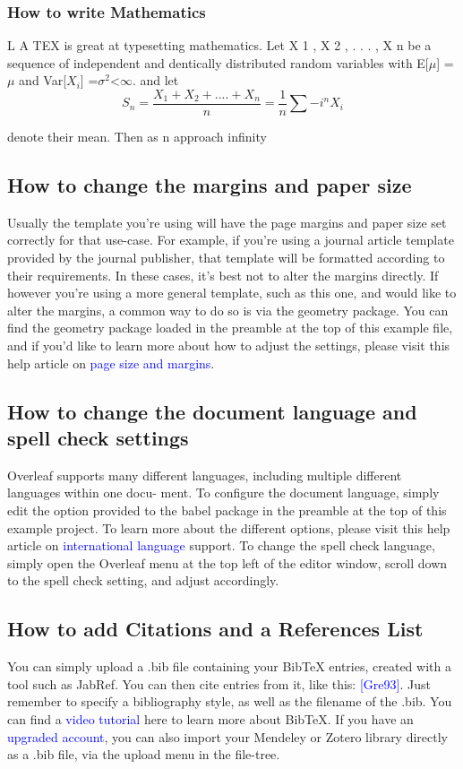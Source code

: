 \documentclass{article} %
\begin{document}
\begin{table}[h]
\subsubsection{How to write Mathematics}
	L A TEX is great at typesetting mathematics. Let X 1 , X 2 , . . . , X n be a sequence of independent and dentically distributed random variables with E[$\mu$] =$\mu$ and Var[$X_i$]
=$\sigma^2$\textless$\infty$. and let \[S_n=\frac{X_1+ X_2+....+X_n}{n}=\frac{1}{n}\sum-{i}^{n} X_i\]

denote their mean. Then as n approach infinity
\subsection{How to change the margins and paper size}
	Usually the template you’re using will have the page margins and paper size set correctly for that
	use-case. For example, if you’re using a journal article template provided by the journal publisher,
	that template will be formatted according to their requirements. In these cases, it’s best not to alter
	the margins directly.
	If however you’re using a more general template, such as this one, and would like to alter the
	margins, a common way to do so is via the geometry package. You can find the geometry package
	loaded in the preamble at the top of this example file, and if you’d like to learn more about how to
	adjust the settings, please visit this help article on \textcolor{blue}{page size and margins}.
	\subsection{How to change the document language and spell check settings}
		Overleaf supports many different languages, including multiple different languages within one docu-
		ment.
		To configure the document language, simply edit the option provided to the babel package in the
		preamble at the top of this example project. To learn more about the different options, please visit
		this help article on \textcolor{blue}{international language} support.
		To change the spell check language, simply open the Overleaf menu at the top left of the editor
		window, scroll down to the spell check setting, and adjust accordingly.
		\subsection{How to add Citations and a References List}
			You can simply upload a .bib file containing your BibTeX entries, created with a tool such as JabRef.
			You can then cite entries from it, like this: \textcolor{blue}{[Gre93]}. Just remember to specify a bibliography style, as
			well as the filename of the .bib. You can find a \textcolor{blue}{video tutorial} here to learn more about BibTeX.
			If you have an \textcolor{blue}{upgraded account}, you can also import your Mendeley or Zotero library directly as
			a .bib file, via the upload menu in the file-tree.

\end{table}
\end{document}
